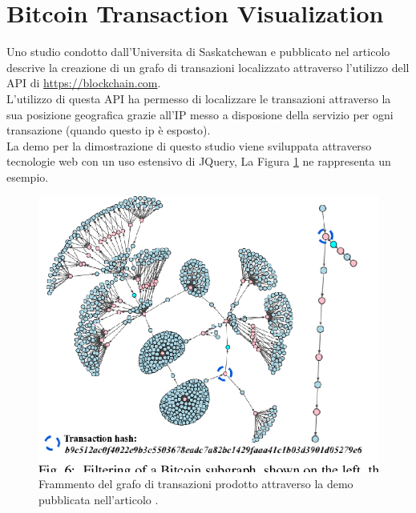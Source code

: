 \section{Bitcoin Transaction Visualization} \label{sec:bitcoinTransactionVis}

Uno studio condotto dall'Universita di Saskatchewan e pubblicato nel articolo \cite{BitcoinBlockchainTransactionsVisualization:article} descrive la creazione di un grafo di transazioni localizzato attraverso l'utilizzo dell API di \url{https://blockchain.com}.\\
L'utilizzo di questa API ha permesso di localizzare le transazioni attraverso la sua posizione geografica grazie all'IP messo a disposione della servizio per ogni transazione (quando questo ip è esposto).\\
La demo per la dimostrazione di questo studio viene sviluppata attraverso tecnologie web con un uso estensivo di JQuery, La Figura \ref{fig:bitcoinTransactionVis} ne rappresenta un esempio.

\begin{figure}[H]
\centering
\includegraphics[scale=0.35]{images/bivaGraph.png}
\caption{Frammento del grafo di transazioni prodotto attraverso la demo pubblicata nell'articolo \cite{BitcoinBlockchainTransactionsVisualization:article}.\label{fig:bitcoinTransactionVis}}
\end{figure}
